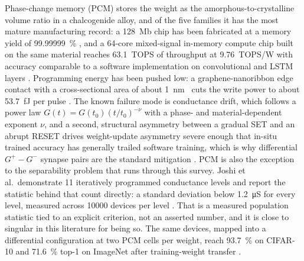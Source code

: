Phase-change memory (PCM) stores the weight as the amorphous-to-crystalline volume ratio
in a chalcogenide alloy, and of the five families it has the most mature manufacturing
record: a 128~Mb  chip has been fabricated at a memory yield of
\SI{99.99999}{\percent} \cite{Xie2025_AdvSci}, and a 64-core mixed-signal in-memory
compute chip built on the same material reaches \num{63.1}~TOPS of throughput at
\num{9.76}~TOPS/W with accuracy comparable to a software implementation on convolutional
and LSTM layers \cite{LeGallo2023_NatElectron}. Programming energy has been pushed low: a
graphene-nanoribbon edge contact with a cross-sectional area of about \SI{1}{\nano\metre
\squared} cuts the write power to about \SI{53.7}{\femto\joule} per pulse
\cite{Wang2022_AdvSci_PCM}. The known failure mode is conductance drift, which follows a
power law $G(t)=G(t_0)(t/t_0)^{-\nu}$ with a phase- and material-dependent exponent
$\nu$, and a second, structural asymmetry between a gradual SET and an abrupt RESET drives
weight-update asymmetry severe enough that in-situ trained accuracy has generally trailed
software training, which is why differential $G^+-G^-$ synapse pairs are the standard
mitigation \cite{Ambrogio2018_Nature}. PCM is also the exception to the separability
problem that runs through this survey. Joshi et al.\ demonstrate 11 iteratively
programmed conductance levels and report the statistic behind that count directly: a
standard deviation below \SI{1.2}{\micro\siemens} for every level, measured across
\num{10000} devices per level \cite{Joshi2020_NatComm}. That is a measured population
statistic tied to an explicit criterion, not an asserted number, and it is close to
singular in this literature for being so. The same devices, mapped into a differential
configuration at two PCM cells per weight, reach \SI{93.7}{\percent} on CIFAR-10 and
\SI{71.6}{\percent} top-1 on ImageNet after training-weight transfer \cite{Joshi2020_NatComm}.

